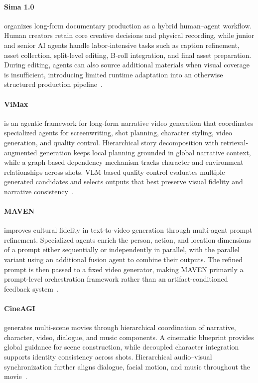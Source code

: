 \paragraph{Sima 1.0}
 organizes long-form documentary production as a hybrid human--agent workflow. Human creators retain core creative decisions and physical recording, while junior and senior AI agents handle labor-intensive tasks such as caption refinement, asset collection, split-level editing, B-roll integration, and final asset preparation. During editing, agents can also source additional materials when visual coverage is insufficient, introducing limited runtime adaptation into an otherwise structured production pipeline~\cite{avg260407721}.

\paragraph{ViMax}
 is an agentic framework for long-form narrative video generation that coordinates specialized agents for screenwriting, shot planning, character styling, video generation, and quality control. Hierarchical story decomposition with retrieval-augmented generation keeps local planning grounded in global narrative context, while a graph-based dependency mechanism tracks character and environment relationships across shots. VLM-based quality control evaluates multiple generated candidates and selects outputs that best preserve visual fidelity and narrative consistency~\cite{huang2026vimax}.

\paragraph{MAVEN}
 improves cultural fidelity in text-to-video generation through multi-agent prompt refinement. Specialized agents enrich the person, action, and location dimensions of a prompt either sequentially or independently in parallel, with the parallel variant using an additional fusion agent to combine their outputs. The refined prompt is then passed to a fixed video generator, making MAVEN primarily a prompt-level orchestration framework rather than an artifact-conditioned feedback system~\cite{avg260516716}.

\paragraph{CineAGI}
 generates multi-scene movies through hierarchical coordination of narrative, character, video, dialogue, and music components. A cinematic blueprint provides global guidance for scene construction, while decoupled character integration supports identity consistency across shots. Hierarchical audio--visual synchronization further aligns dialogue, facial motion, and music throughout the movie~\cite{avg260423579}.

